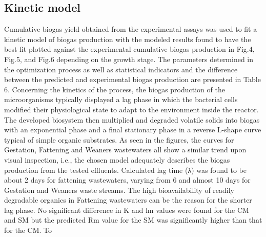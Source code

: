 \subsection{Kinetic model}
Cumulative biogas yield obtained from the experimental assays was used to fit a kinetic model of biogas production with the modeled results found to have the best fit plotted against the experimental cumulative biogas production in Fig.4, Fig.5, and Fig.6 depending on the growth stage. The parameters determined in the optimization process as well as statistical indicators and the difference between the predicted and experimental biogas production are presented in Table 6.
Concerning the kinetics of the process, the biogas production of the microorganisms typically displayed a lag phase in which the bacterial cells modified their physiological state to adapt to the environment inside the reactor. The developed biosystem then multiplied and degraded volatile solids into biogas with an exponential phase and a final stationary phase in a reverse L-shape curve typical of simple organic substrates. As seen in the figures, the curves for Gestation, Fattening and Weaners wastewaters all show a similar trend upon visual inspection, i.e., the chosen model adequately describes the biogas production from the tested effluents. Calculated lag time (λ) was found to be about 2 days for fattening wastewaters, varying from 6 and almost 10 days for Gestation and Weaners waste streams. The high bioavailability of readily degradable organics in Fattening wastewaters can be the reason for the shorter lag phase. No significant difference in K and lm values were found for the CM and SM but the predicted Rm value for the SM was significantly higher than that for the CM. To
